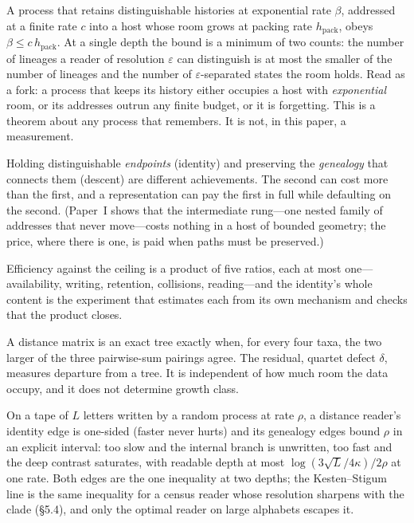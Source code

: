 \documentclass[11pt]{article}
\newcommand{\hpack}{h_{\mathrm{pack}}}
\begin{document}
\begin{description}[leftmargin=1.2em,style=nextline]
\item[The room (the limit).] A process that retains distinguishable histories at exponential rate $\beta$, addressed at a finite rate $c$ into a host whose room grows at packing rate $\hpack$, obeys $\beta \le c\,\hpack$. At a single depth the bound is a minimum of two counts: the number of lineages a reader of resolution $\varepsilon$ can distinguish is at most the smaller of the number of lineages and the number of $\varepsilon$-separated states the room holds. Read as a fork: a process that keeps its history either occupies a host with \emph{exponential} room, or its addresses outrun any finite budget, or it is forgetting. This is a theorem about any process that remembers. It is not, in this paper, a measurement.
\item[Names versus paths (the ladder).] Holding distinguishable \emph{endpoints} (identity) and preserving the \emph{genealogy} that connects them (descent) are different achievements. The second can cost more than the first, and a representation can pay the first in full while defaulting on the second. (Paper~I shows that the intermediate rung---one nested family of addresses that never move---costs nothing in a host of bounded geometry; the price, where there is one, is paid when paths must be preserved.)
\item[The audit.] Efficiency against the ceiling is a product of five ratios, each at most one---availability, writing, retention, collisions, reading---and the identity's whole content is the experiment that estimates each from its own mechanism and checks that the product closes.
\item[The classifier (quartets).] A distance matrix is an exact tree exactly when, for every four taxa, the two larger of the three pairwise-sum pairings agree. The residual, quartet defect $\delta$, measures departure from a tree. It is independent of how much room the data occupy, and it does not determine growth class.
\item[The window (finite tapes).] On a tape of $L$ letters written by a random process at rate $\rho$, a distance reader's identity edge is one-sided (faster never hurts) and its genealogy edges bound $\rho$ in an explicit interval: too slow and the internal branch is unwritten, too fast and the deep contrast saturates, with readable depth at most $\log(3\sqrt L/4\kappa)/2\rho$ at one rate. Both edges are the one inequality at two depths; the Kesten--Stigum line is the same inequality for a census reader whose resolution sharpens with the clade (\S5.4), and only the optimal reader on large alphabets escapes it.
\end{description}
\end{document}
